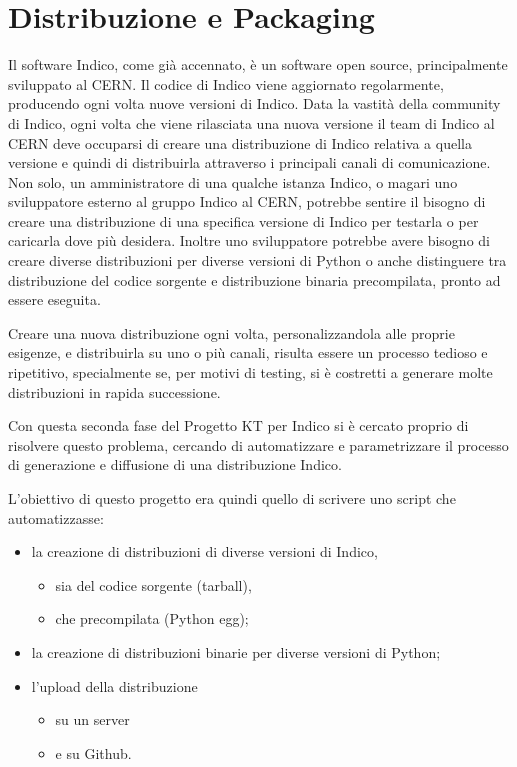\chapter{Distribuzione e Packaging} \label{chap:distribuzione_packaging}

    Il software Indico, come già accennato, è un software open source, principalmente sviluppato al \ac{CERN}. Il codice di Indico viene aggiornato regolarmente, producendo ogni volta nuove versioni di Indico. Data la vastità della community di Indico, ogni volta che viene rilasciata una nuova versione il team di Indico al \ac{CERN} deve occuparsi di creare una distribuzione di Indico relativa a quella versione e quindi di distribuirla attraverso i principali canali di comunicazione. Non solo, un amministratore di una qualche istanza Indico, o magari uno sviluppatore esterno al gruppo Indico al \ac{CERN}, potrebbe sentire il bisogno di creare una distribuzione di una specifica versione di Indico per testarla o per caricarla dove più desidera. Inoltre uno sviluppatore potrebbe avere bisogno di creare diverse distribuzioni per diverse versioni di Python o anche distinguere tra distribuzione del codice sorgente e distribuzione binaria precompilata, pronto ad essere eseguita.
    
    Creare una nuova distribuzione ogni volta, personalizzandola alle proprie esigenze, e distribuirla su uno o più canali, risulta essere un processo tedioso e ripetitivo, specialmente se, per motivi di testing, si è costretti a generare molte distribuzioni in rapida successione.
    
    Con questa seconda fase del Progetto KT per Indico si è cercato proprio di risolvere questo problema, cercando di automatizzare e parametrizzare il processo di generazione e diffusione di una distribuzione Indico.
    
    L'obiettivo di questo progetto era quindi quello di scrivere uno script che automatizzasse:
    
    \begin{itemize}
        \item la creazione di distribuzioni di diverse versioni di Indico,
        \begin{itemize}
            \item sia del codice sorgente (tarball),
            \item che precompilata (Python egg);
        \end{itemize}
        \item la creazione di distribuzioni binarie per diverse versioni di Python;
        \item l'upload della distribuzione
        \begin{itemize}
            \item su un server
            \item e su Github.
        \end{itemize}
    \end{itemize}
    

